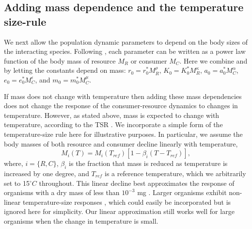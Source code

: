 \documentclass[11pt]{article}
\begin{document}
\subsection*{Adding mass dependence and the temperature size-rule}

We next allow the population dynamic parameters to depend on the body sizes of the interacting species.
Following \cite{DeLong2015}, each parameter can be written as a power law function of the body mass of resource $M_R$ or consumer $M_C$.
Here we combine \cite{DeLong2015} and \cite{Gilbert2014} by letting the constants depend on mass: $r_0 = r_0^* M_R^\rho$, $K_0 = K_0^* M_R^\kappa$, $a_0 = a_0^* M_C^\alpha$, $e_0 = e_0^* M_C^\epsilon$, and $m_0 = m_0^* M_C^\mu$.

If mass does not change with temperature then adding these mass dependencies does not change the response of the consumer-resource dynamics to changes in temperature.
However, as stated above, mass is expected to change with temperature, according to the TSR \citep{Atkinson1994, Gardner2011, Forster2012}.
We incorporate a simple form of the temperature-size rule here for illustrative purposes.
In particular, we assume the body masses of both resource and consumer decline linearly with temperature, 
\[M_i(T) = M_i(T_{ref}) [1 - \beta_i (T - T_{ref})], \]
where, $i=\{R,C\}$, $\beta_i$ is the fraction that mass is reduced as temperature is increased by one degree, and $T_{ref}$ is a reference temperature, which we arbitrarily set to 15$^\circ C$ throughout.
This linear decline best approximates the response of organisms with a dry mass of less than $10^{-3}$ mg \citep[i.e., unicellular consumer and resource, e.g.,][]{DeLong2012}. 
Larger organisms exhibit non-linear temperature-size responses \citep{Forster2012,Horne2015}, which could easily be incorporated but is ignored here for simplicity.
Our linear approximation still works well for large organisms when the change in temperature is small.
\end{document}
